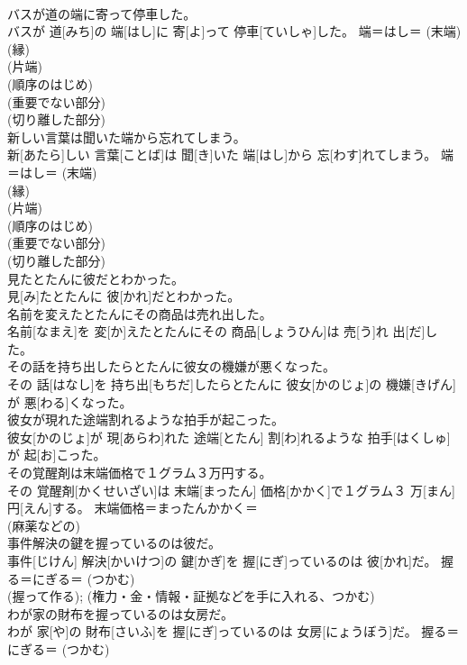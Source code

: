 \documentclass[8pt]{extreport}
\begin{document}
\begin{CJK}{UTF8}{min}
{\\	バスが道の端に寄って停車した。	
\\	バスが 道[みち]の 端[はし]に 寄[よ]って 停車[ていしゃ]した。	端＝はし＝ (末端) 
\\	(縁) 
\\	(片端) 
\\	(順序のはじめ) 
\\	(重要でない部分) 
\\	(切り離した部分) 
\\	新しい言葉は聞いた端から忘れてしまう。	
\\	新[あたら]しい 言葉[ことば]は 聞[き]いた 端[はし]から 忘[わす]れてしまう。	端＝はし＝ (末端) 
\\	(縁) 
\\	(片端) 
\\	(順序のはじめ) 
\\	(重要でない部分) 
\\	(切り離した部分) 
\\	見たとたんに彼だとわかった。	
\\	見[み]たとたんに 彼[かれ]だとわかった。	
\\	名前を変えたとたんにその商品は売れ出した。	
\\	名前[なまえ]を 変[か]えたとたんにその 商品[しょうひん]は 売[う]れ 出[だ]した。	
\\	その話を持ち出したらとたんに彼女の機嫌が悪くなった。	
\\	その 話[はなし]を 持ち出[もちだ]したらとたんに 彼女[かのじょ]の 機嫌[きげん]が 悪[わる]くなった。	
\\	彼女が現れた途端割れるような拍手が起こった。	
\\	彼女[かのじょ]が 現[あらわ]れた 途端[とたん] 割[わ]れるような 拍手[はくしゅ]が 起[お]こった。	
\\	その覚醒剤は末端価格で１グラム３万円する。	
\\	その 覚醒剤[かくせいざい]は 末端[まったん] 価格[かかく]で１グラム３ 万[まん] 円[えん]する。	末端価格＝まったんかかく＝ 
\\	(麻薬などの) 
\\	事件解決の鍵を握っているのは彼だ。	
\\	事件[じけん] 解決[かいけつ]の 鍵[かぎ]を 握[にぎ]っているのは 彼[かれ]だ。	握る＝にぎる＝ (つかむ) 
\\	(握って作る); (権力・金・情報・証拠などを手に入れる、つかむ) 
\\	わが家の財布を握っているのは女房だ。	
\\	わが 家[や]の 財布[さいふ]を 握[にぎ]っているのは 女房[にょうぼう]だ。	握る＝にぎる＝ (つかむ) 
}
\end{CJK}
\end{document}
